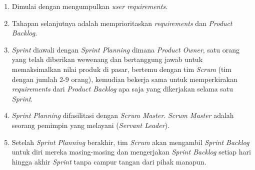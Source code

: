 \begin {enumerate}[1.]
\item Dimulai dengan mengumpulkan \textit{user requirements}.
\item Tahapan selanjutnya adalah memprioritaskan \textit{requirements} dan \textit{Product Backlog}.
\item \textit{Sprint} diawali dengan \textit{Sprint Planning} dimana \textit{Product Owner}, satu orang yang telah diberikan wewenang dan bertanggung jawab untuk memaksimalkan nilai produk di pasar, bertemu dengan tim \textit{Scrum} (tim dengan jumlah 2-9 orang), kemudian bekerja sama untuk memperkirakan \textit{requirements} dari \textit{Product Backlog} apa saja yang dikerjakan selama satu \textit{Sprint}.
\item \textit{Sprint Planning} difasilitasi dengan \textit{Scrum Master}. \textit{Scrum Master} adalah seorang pemimpin yang melayani (\textit{Servant Leader}).
\item Setelah \textit{Sprint Planning} berakhir, tim \textit{Scrum} akan mengambil \textit{Sprint Backlog} untuk diri mereka masing-masing dan mengerjakan \textit{Sprint Backlog} setiap hari hingga akhir \textit{Sprint} tanpa campur tangan dari pihak manapun.

\end{enumerate}
